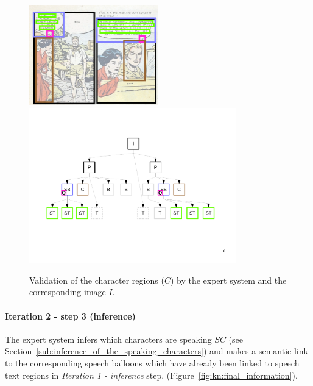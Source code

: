  \begin{figure}[!ht]  %
   \centering
   \includegraphics[trim= 0px 0px 0px 0px, clip, width=0.5\textwidth]{process_illustration_valid_2.png}\\
  \includegraphics[trim= 0px 128px 20px 85px, clip, width=0.8\textwidth]{graph_valid_2.pdf}
  \caption[Validation of the character regions ($C$) by the expert system]{Validation of the character regions ($C$) by the expert system and the corresponding image $I$.
  }
  \label{fig:kn:valid_2}
 \end{figure}

\paragraph{Iteration 2 - step 3 (inference)} %
\label{par:step_6}
The expert system infers which characters are speaking $SC$ (see Section~\ref{sub:inference_of_the_speaking_characters}) and makes a semantic link to the corresponding speech balloons which have already been linked to speech text regions in {\it Iteration 1 - inference} step. (Figure~\ref{fig:kn:final_information}).


